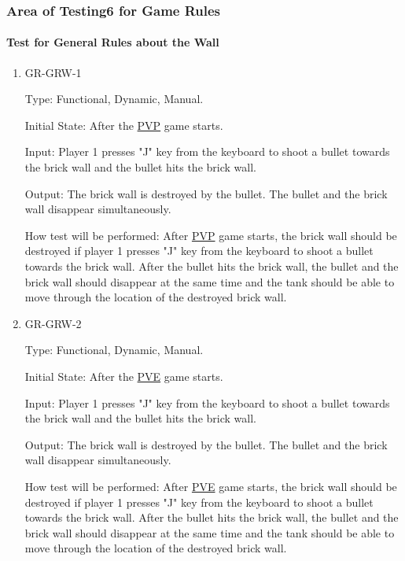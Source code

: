 \documentclass[12pt, titlepage]{article}
\begin{document}
\subsubsection{Area of Testing6 for Game Rules}

\paragraph{Test for General Rules about the Wall}

\begin{enumerate}

\item{GR-GRW-1\\}

Type: Functional, Dynamic, Manual.
					
Initial State: After the \underline{PVP} game starts. 
					
Input: Player 1 presses "J" key from the keyboard to shoot a bullet towards the brick wall and the bullet hits the brick wall.
					
Output: The brick wall is destroyed by the bullet. The bullet and the brick wall disappear simultaneously.
					
How test will be performed: After \underline{PVP} game starts, the brick wall should be destroyed if player 1 presses "J" key from the keyboard to shoot a bullet towards the brick wall. After the bullet hits the brick wall, the bullet and the brick wall should disappear at the same time and the tank should be able to move through the location of the destroyed brick wall.

\item{GR-GRW-2\\}

Type: Functional, Dynamic, Manual.
					
Initial State: After the \underline{PVE} game starts. 
					
Input: Player 1 presses "J" key from the keyboard to shoot a bullet towards the brick wall and the bullet hits the brick wall.
					
Output: The brick wall is destroyed by the bullet. The bullet and the brick wall disappear simultaneously.
					
How test will be performed: After \underline{PVE} game starts, the brick wall should be destroyed if player 1 presses "J" key from the keyboard to shoot a bullet towards the brick wall. After the bullet hits the brick wall, the bullet and the brick wall should disappear at the same time and the tank should be able to move through the location of the destroyed brick wall.


\end{enumerate}
\end{document}
